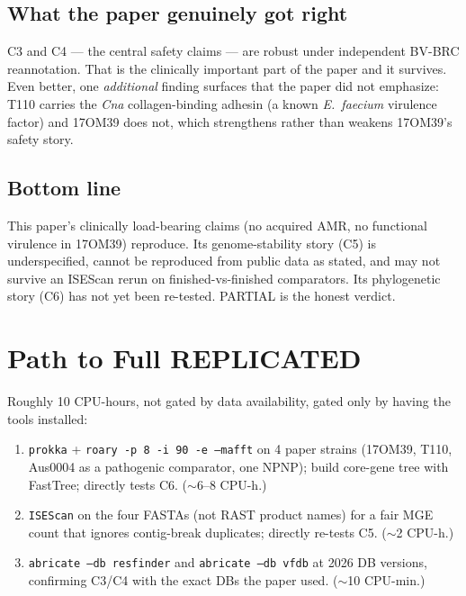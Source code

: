 \documentclass[11pt,a4paper]{article}
\begin{document}
\subsection{What the paper genuinely got right}
C3 and C4 --- the central safety claims --- are robust under independent BV-BRC reannotation. That is the clinically important part of the paper and it survives. Even better, one \emph{additional} finding surfaces that the paper did not emphasize: T110 carries the \emph{Cna} collagen-binding adhesin (a known \emph{E.\ faecium} virulence factor) and 17OM39 does not, which strengthens rather than weakens 17OM39's safety story.

\subsection{Bottom line}
This paper's clinically load-bearing claims (no acquired AMR, no functional virulence in 17OM39) reproduce. Its genome-stability story (C5) is underspecified, cannot be reproduced from public data as stated, and may not survive an ISEScan rerun on finished-vs-finished comparators. Its phylogenetic story (C6) has not yet been re-tested. PARTIAL is the honest verdict.

\section{Path to Full REPLICATED}
Roughly 10 CPU-hours, not gated by data availability, gated only by having the tools installed:
\begin{enumerate}[nosep]
\item \texttt{prokka} + \texttt{roary -p 8 -i 90 -e --mafft} on 4 paper strains (17OM39, T110, Aus0004 as a pathogenic comparator, one NPNP); build core-gene tree with FastTree; directly tests C6. ($\sim$6--8 CPU-h.)
\item \texttt{ISEScan} on the four FASTAs (not RAST product names) for a fair MGE count that ignores contig-break duplicates; directly re-tests C5. ($\sim$2 CPU-h.)
\item \texttt{abricate --db resfinder} and \texttt{abricate --db vfdb} at 2026 DB versions, confirming C3/C4 with the exact DBs the paper used. ($\sim$10 CPU-min.)
\end{enumerate}
\end{document}
